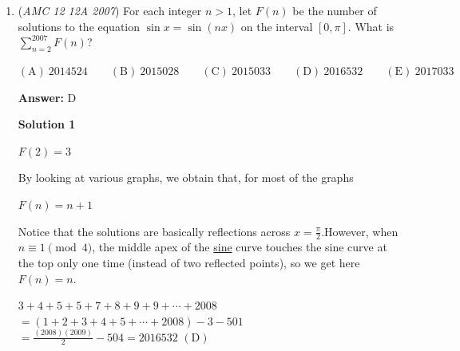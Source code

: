 \begin{enumerate}
 $(x-6, y)$

 and

 $(x-6, y+6)$

 respectively.

 Substituting these coordinates into the equations given yields $y = \log_{a}x,$ $y = 2\log_{a}x-6,$ and $y+6 = 3\log_{a}x-6$. Rearranging a bit, we get the following equations:

 $1) a^y = x$
$2) a^y = (x-6)^2$
$3) a^{y+6} = (x-6)^3$

 Using equations 1 and 2, we get $x=(x-6)^2$. Solving yields $x=9, x=4$. However, $4$ is extraneous because $x-6=4-6=-2$ is negative and makes it impossible for points $B$ and $C$ to be on the graphs of $y = 2\log_{a}x$ and $y = 3\log_{a}x$, respectively. This means $x=9$ (also because we know $A$ has to have a positive $x$-coordinate). Using the second and third equations, we get

 $\frac{a^{y+6}}{a^y} = \frac{(x-6)^3}{(x-6)^2}$ $\Rightarrow$ $a^6 = x-6$.

 Plugging in $9$ for $x$ yields $a^6 = 3$, or $a= \sqrt[6]{3} \Rightarrow \boxed{\text{A}}$.

 


	\item (\textit{AMC 12 12A 2007}) For each integer $n>1$, let $F(n)$ be the number of solutions to the equation $\sin{x}=\sin{(nx)}$ on the interval $[0,\pi]$. What is $\sum_{n=2}^{2007} F(n)$?


 $\mathrm{(A)}\ 2014524 \qquad \mathrm{(B)}\ 2015028 \qquad \mathrm{(C)}\ 2015033 \qquad \mathrm{(D)}\ 2016532 \qquad \mathrm{(E)}\ 2017033$

 \textbf{Answer: }D



\textbf{Solution 1}

$F(2)=3$

 By looking at various graphs, we obtain that, for most of the graphs

 $F(n) = n + 1$

 Notice that the solutions are basically reflections across $x = \frac{\pi}{2}$.However, when $n \equiv 1 \pmod{4}$, the middle apex of the \href{https://artofproblemsolving.com/wiki/index.php?title=Sine}{sine} curve touches the sine curve at the top only one time (instead of two reflected points), so we get here $F(n) = n$.

 $3+4+5+5+7+8+9+9+\cdots+2008$$= (1+2+3+4+5+\cdots+2008) - 3 - 501$$= \frac{(2008)(2009)}{2} - 504 = 2016532$ $\mathrm{(D)}$





\end{enumerate}
